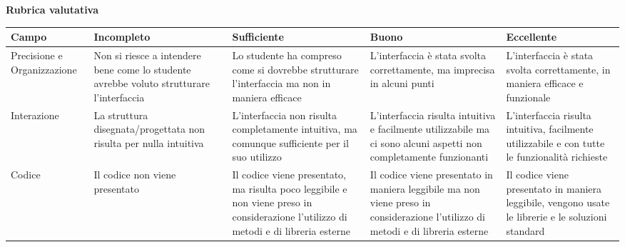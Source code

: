 \textbf{Rubrica valutativa}  
\begin{center}
  
\begin{tabular}{|p{3cm}|p{3cm}|p{3cm}|p{3cm}|p{3cm}||}
  \hline
  Campo &Incompleto & Sufficiente & Buono & Eccellente \\
  \hline
  Precisione e Organizzazione & Non si riesce a intendere bene come lo studente avrebbe voluto strutturare l'interfaccia & Lo studente ha compreso come si dovrebbe strutturare l'interfaccia ma non in maniera efficace & L'interfaccia è stata svolta correttamente, ma imprecisa in alcuni punti & L'interfaccia è stata svolta correttamente, in maniera efficace e funzionale \\
  \hline
  Interazione & La struttura disegnata/progettata non risulta per nulla intuitiva & L'interfaccia non risulta completamente intuitiva, ma comunque sufficiente per il suo utilizzo & L'interfaccia risulta intuitiva e facilmente utilizzabile ma ci sono alcuni aspetti non completamente funzionanti & L'interfaccia risulta intuitiva, facilmente utilizzabile e con tutte le funzionalità richieste \\
  \hline
  Codice & Il codice non viene presentato & Il codice viene presentato, ma risulta poco leggibile e non viene preso in considerazione l'utilizzo di metodi e di libreria esterne & Il codice viene presentato in maniera leggibile ma non viene preso in considerazione l'utilizzo di metodi e di libreria esterne & Il codice viene presentato in maniera leggibile, vengono usate le librerie e le soluzioni standard \\
  \hline
\end{tabular}

\end{center}